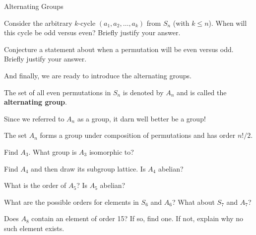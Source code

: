 \begin{section}{Alternating Groups}
\begin{problem}
Consider the arbitrary $k$-cycle $(a_1,a_2,\ldots, a_k)$ from $S_n$ (with $k\leq n$).  When will this cycle be odd versus even?  Briefly justify your answer. 
\end{problem}

\begin{problem}
Conjecture a statement about when a permutation will be even versus odd.  Briefly justify your answer.
\end{problem}

And finally, we are ready to introduce the alternating groups.

\begin{definition}
The set of all even permutations in $S_n$ is denoted by $A_n$ and is called the \textbf{alternating group}.
\end{definition}

Since we referred to $A_n$ as a group, it darn well better be a group!

\begin{theorem}
The set $A_n$ forms a group under composition of permutations and has order $n!/2$.
\end{theorem}

\begin{exercise}
Find $A_3$.  What group is $A_3$ isomorphic to?
\end{exercise}

\begin{exercise}
Find $A_4$ and then draw its subgroup lattice. Is $A_4$ abelian?
\end{exercise}

\begin{exercise}
What is the order of $A_5$?  Is $A_5$ abelian?
\end{exercise}

\begin{exercise}
What are the possible orders for elements in $S_6$ and $A_6$?  What about $S_7$ and $A_7$?
\end{exercise}

\begin{exercise}
Does $A_8$ contain an element of order 15?  If so, find one.  If not, explain why no such element exists.
\end{exercise}


\end{section}

